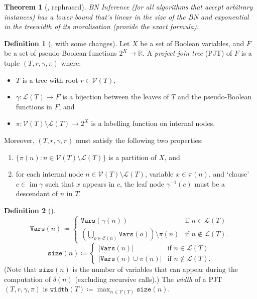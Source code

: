 \documentclass{article}
\newtheorem{theorem}{Theorem}
\theoremstyle{definition}
\newtheorem{definition}{Definition}
\theoremstyle{remark}
\DeclareMathOperator{\im}{im}
\begin{document}
\begin{theorem}[\cite{DBLP:conf/ecai/KwisthoutBG10}, rephrased]
  BN Inference (for all algorithms that accept arbitrary instances) has a lower
  bound that's linear in the size of the BN and exponential in the treewidth of
  its moralisation (provide the exact formula).
\end{theorem}

\begin{definition}[\cite{DBLP:conf/cp/DudekPV20}, with some changes]
  Let $X$ be a set of Boolean variables, and $F$ be a set of pseudo-Boolean
  functions $2^X \to \mathbb{R}$. A \emph{project-join tree} (PJT) of $F$ is a
  tuple $(T, r, \gamma, \pi)$ where:
  \begin{itemize}
  \item $T$ is a tree with root $r \in \mathcal{V}(T)$,
  \item $\gamma\colon \mathcal{L}(T) \to F$ is a bijection between the leaves of
    $T$ and the pseudo-Boolean functions in $F$, and
  \item $\pi\colon \mathcal{V}(T) \setminus \mathcal{L}(T) \to 2^X$ is a
    labelling function on internal nodes.
  \end{itemize}
  Moreover, $(T, r, \gamma, \pi)$ must satisfy the following two properties:
  \begin{enumerate}
  \item $\{\pi(n) : n \in \mathcal{V}(T) \setminus \mathcal{L}(T)\}$ is a
    partition of $X$, and
  \item for each internal node $n \in \mathcal{V}(T) \setminus \mathcal{L}(T)$,
    variable $x \in \pi(n)$, and `clause' $c \in \im \gamma$ such that $x$
    appears in $c$, the leaf node $\gamma^{-1}(c)$ must be a descendant of $n$
    in $T$.
  \end{enumerate}
\end{definition}

\begin{definition}[\cite{DBLP:conf/cp/DudekPV20}] \label{def:size}
  \[
    \mathtt{Vars}(n) \coloneqq
    \begin{cases}
      \mathtt{Vars}(\gamma(n)) & \text{if } n \in \mathcal{L}(T) \\
      \left( \bigcup_{o \in \mathcal{C}(n)} \mathtt{Vars}(o) \right) \setminus
      \pi(n) & \text{if } n \not\in \mathcal{L}(T).
    \end{cases}
  \]
  \[
    \mathtt{size}(n) \coloneqq
    \begin{cases}
      |\mathtt{Vars}(n)| & \text{if } n \in \mathcal{L}(T) \\
      |\mathtt{Vars}(n) \cup \pi(n)| & \text{if } n \not\in \mathcal{L}(T).
    \end{cases}
  \]
  (Note that $\mathtt{size}(n)$ is the number of variables that can appear
  during the computation of $\delta(n)$ (excluding recursive calls).)
  The \emph{width} of a PJT $(T, r, \gamma, \pi)$ is
  $\mathtt{width}(T) \coloneqq \max_{n \in \mathcal{V}(T)} \mathtt{size}(n)$.
\end{definition}
\end{document}
